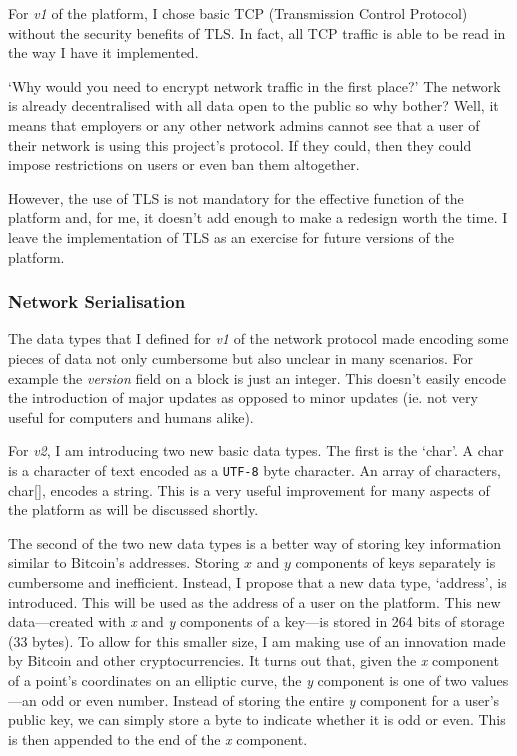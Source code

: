 \documentclass{article}
\begin{document}
For \textit{v1} of the platform, I chose basic TCP (Transmission Control Protocol) without the security benefits of TLS. In fact, all TCP traffic is able to be read in the way I have it implemented.

`Why would you need to encrypt network traffic in the first place?' The network is already decentralised with all data open to the public so why bother? Well, it means that employers or any other network admins cannot see that a user of their network is using this project's protocol. If they could, then they could impose restrictions on users or even ban them altogether.

However, the use of TLS is not mandatory for the effective function of the platform and, for me, it doesn't add enough to make a redesign worth the time. I leave the implementation of TLS as an exercise for future versions of the platform.

\subsubsection{Network Serialisation}
The data types that I defined for \textit{v1} of the network protocol made encoding some pieces of data not only cumbersome but also unclear in many scenarios. For example the \textit{version} field on a block is just an integer. This doesn't easily encode the introduction of major updates as opposed to minor updates (ie. not very useful for computers and humans alike).

For \textit{v2}, I am introducing two new basic data types. The first is the `char'. A char is a character of text encoded as a \texttt{UTF-8} byte character. An array of characters, char[\hspace{0.05cm}], encodes a string. This is a very useful improvement for many aspects of the platform as will be discussed shortly.

The second of the two new data types is a better way of storing key information similar to Bitcoin's addresses. Storing $x$ and $y$ components of keys separately is cumbersome and inefficient. Instead, I propose that a new data type, `address', is introduced. This will be used as the address of a user on the platform. This new data---created with \textit{x} and \textit{y} components of a key---is stored in 264 bits of storage (33 bytes). To allow for this smaller size, I am making use of an innovation made by Bitcoin and other cryptocurrencies. It turns out that, given the \textit{x} component of a point's coordinates on an elliptic curve, the \textit{y} component is one of two values---an odd or even number. Instead of storing the entire \textit{y} component for a user's public key, we can simply store a byte to indicate whether it is odd or even. This is then appended to the end of the \textit{x} component.
\end{document}
